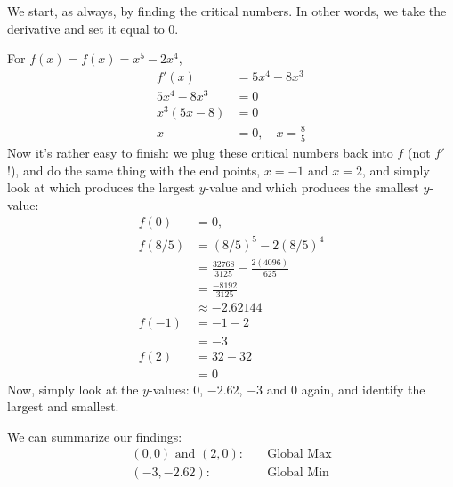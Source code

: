 \documentclass[oneside]{book}
\theoremstyle{definition}
\newtheorem{example}{Example}
\theoremstyle{solution}
\newtheorem*{solution}{Solution}
\newenvironment{solution}{\vspace{2in}\comment}{\endcomment}
\begin{document}
\begin{solution}
  We start, as always, by finding the critical numbers.  In other
  words, we take the derivative and set it equal to $0$.

  For $f(x) = f(x) = x^5 - 2x^4$,
  \begin{align*}
    f'(x)     & = 5x^4-8x^3 \\
    5x^4-8x^3 & = 0         \\
    x^3(5x-8) & = 0         \\
    x         & = 0,\quad x = \frac{8}{5}
  \end{align*}
  Now it's rather easy to finish: we plug these critical numbers back
  into $f$ (not $f'$!), and do the same thing with the end points,
  $x=-1$ and $x=2$, and simply look at which produces the largest
  $y$-value and which produces the smallest $y$-value:
  \begin{align*}
    f(0) & = 0, \\
    f(8/5) &= (8/5)^5 - 2(8/5)^4\\
         & =  \frac{32768}{3125} - \frac{2(4096)}{625} \\
         & = \frac{-8192}{3125} \\
         & \approx -2.62144\\
    f(-1) & = -1-2\\
         & = -3\\
    f(2) & = 32 - 32\\
         & = 0
  \end{align*}
  Now, simply look at the $y$-values: $0$, $-2.62$, $-3$ and $0$
  again, and identify the largest and smallest.

We can summarize our findings:
\begin{align*}
(0,0) \text{ and }(2,0) :& \quad\text{Global Max}\\
(-3, -2.62): & \quad\text{Global Min}
\end{align*}
\end{solution}


%
\end{document}
